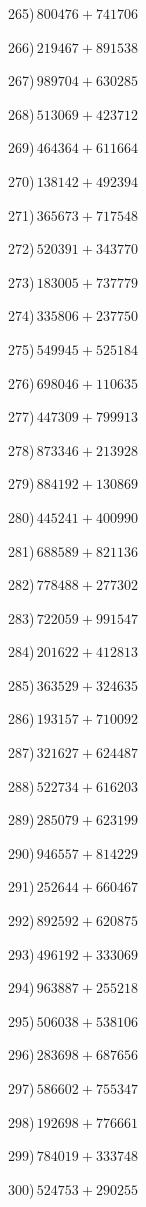 \documentclass{article}
\begin{document}
\begin{multicols}{2}
265)$\,800476+741706$ \par 
266)$\,219467+891538$ \par 
267)$\,989704+630285$ \par 
268)$\,513069+423712$ \par 
269)$\,464364+611664$ \par 
270)$\,138142+492394$ \par 
271)$\,365673+717548$ \par 
272)$\,520391+343770$ \par 
273)$\,183005+737779$ \par 
274)$\,335806+237750$ \par 
275)$\,549945+525184$ \par 
276)$\,698046+110635$ \par 
277)$\,447309+799913$ \par 
278)$\,873346+213928$ \par 
279)$\,884192+130869$ \par 
280)$\,445241+400990$ \par 
281)$\,688589+821136$ \par 
282)$\,778488+277302$ \par 
283)$\,722059+991547$ \par 
284)$\,201622+412813$ \par 
285)$\,363529+324635$ \par 
286)$\,193157+710092$ \par 
287)$\,321627+624487$ \par 
288)$\,522734+616203$ \par 
289)$\,285079+623199$ \par 
290)$\,946557+814229$ \par 
291)$\,252644+660467$ \par 
292)$\,892592+620875$ \par 
293)$\,496192+333069$ \par 
294)$\,963887+255218$ \par 
295)$\,506038+538106$ \par 
296)$\,283698+687656$ \par 
297)$\,586602+755347$ \par 
298)$\,192698+776661$ \par 
299)$\,784019+333748$ \par 
300)$\,524753+290255$ \par 
\end{multicols} 
\end{document}
